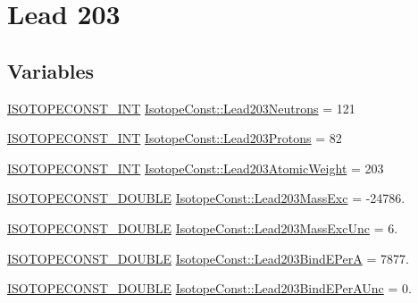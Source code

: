 \hypertarget{group___isotope_const-_lead-_pb203}{}\section{Lead 203}
\label{group___isotope_const-_lead-_pb203}
\subsection*{Variables}
\begin{DoxyCompactItemize}
\item 
\mbox{\hyperlink{group___isotope_const-_macros_ga5f18360b3e99483a35c32d789e62621c}{I\+S\+O\+T\+O\+P\+E\+C\+O\+N\+S\+T\+\_\+\+I\+NT}} \mbox{\hyperlink{group___isotope_const-_lead-_pb203_gabf9ce7aaeea976367dbe5ac41662c5c1}{Isotope\+Const\+::\+Lead203\+Neutrons}} = 121
\item 
\mbox{\hyperlink{group___isotope_const-_macros_ga5f18360b3e99483a35c32d789e62621c}{I\+S\+O\+T\+O\+P\+E\+C\+O\+N\+S\+T\+\_\+\+I\+NT}} \mbox{\hyperlink{group___isotope_const-_lead-_pb203_gad52c1b218a15f53da574824bd424ac6a}{Isotope\+Const\+::\+Lead203\+Protons}} = 82
\item 
\mbox{\hyperlink{group___isotope_const-_macros_ga5f18360b3e99483a35c32d789e62621c}{I\+S\+O\+T\+O\+P\+E\+C\+O\+N\+S\+T\+\_\+\+I\+NT}} \mbox{\hyperlink{group___isotope_const-_lead-_pb203_gade4bbf069dec392255a8b6ee567faf6c}{Isotope\+Const\+::\+Lead203\+Atomic\+Weight}} = 203
\item 
\mbox{\hyperlink{group___isotope_const-_macros_ga8f45a7272ce02c0b4c65c44636ed719a}{I\+S\+O\+T\+O\+P\+E\+C\+O\+N\+S\+T\+\_\+\+D\+O\+U\+B\+LE}} \mbox{\hyperlink{group___isotope_const-_lead-_pb203_gad2cec79e6554ee704d33e9c27cc375b3}{Isotope\+Const\+::\+Lead203\+Mass\+Exc}} = -\/24786.
\item 
\mbox{\hyperlink{group___isotope_const-_macros_ga8f45a7272ce02c0b4c65c44636ed719a}{I\+S\+O\+T\+O\+P\+E\+C\+O\+N\+S\+T\+\_\+\+D\+O\+U\+B\+LE}} \mbox{\hyperlink{group___isotope_const-_lead-_pb203_gadbb907d9715b3758beb7905a5d38ae3a}{Isotope\+Const\+::\+Lead203\+Mass\+Exc\+Unc}} = 6.
\item 
\mbox{\hyperlink{group___isotope_const-_macros_ga8f45a7272ce02c0b4c65c44636ed719a}{I\+S\+O\+T\+O\+P\+E\+C\+O\+N\+S\+T\+\_\+\+D\+O\+U\+B\+LE}} \mbox{\hyperlink{group___isotope_const-_lead-_pb203_ga3519c71f8f248ed6cc1856a1c3c37c2f}{Isotope\+Const\+::\+Lead203\+Bind\+E\+PerA}} = 7877.
\item 
\mbox{\hyperlink{group___isotope_const-_macros_ga8f45a7272ce02c0b4c65c44636ed719a}{I\+S\+O\+T\+O\+P\+E\+C\+O\+N\+S\+T\+\_\+\+D\+O\+U\+B\+LE}} \mbox{\hyperlink{group___isotope_const-_lead-_pb203_ga9fecf3ccf1abf379535a76b810af2153}{Isotope\+Const\+::\+Lead203\+Bind\+E\+Per\+A\+Unc}} = 0.

\end{DoxyCompactItemize}
